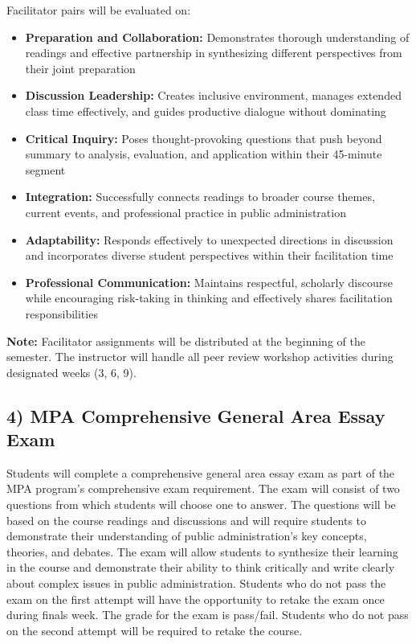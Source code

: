 \documentclass[12pt, letterpaper]{article}
\begin{document}
Facilitator pairs will be evaluated on:
\begin{itemize}
    \item \textbf{Preparation and Collaboration:} Demonstrates thorough understanding of readings and effective partnership in synthesizing different perspectives from their joint preparation
    \item \textbf{Discussion Leadership:} Creates inclusive environment, manages extended class time effectively, and guides productive dialogue without dominating
    \item \textbf{Critical Inquiry:} Poses thought-provoking questions that push beyond summary to analysis, evaluation, and application within their 45-minute segment
    \item \textbf{Integration:} Successfully connects readings to broader course themes, current events, and professional practice in public administration
    \item \textbf{Adaptability:} Responds effectively to unexpected directions in discussion and incorporates diverse student perspectives within their facilitation time
    \item \textbf{Professional Communication:} Maintains respectful, scholarly discourse while encouraging risk-taking in thinking and effectively shares facilitation responsibilities
\end{itemize}

\textbf{Note:} Facilitator assignments will be distributed at the beginning of the semester. The instructor will handle all peer review workshop activities during designated weeks (3, 6, 9).

\subsection*{4) MPA Comprehensive General Area Essay Exam}

Students will complete a comprehensive general area essay exam as part of the MPA program's comprehensive exam requirement. The exam will consist of two questions from which students will choose one to answer. The questions will be based on the course readings and discussions and will require students to demonstrate their understanding of public administration's key concepts, theories, and debates. The exam will allow students to synthesize their learning in the course and demonstrate their ability to think critically and write clearly about complex issues in public administration. Students who do not pass the exam on the first attempt will have the opportunity to retake the exam once during finals week. The grade for the exam is pass/fail. Students who do not pass on the second attempt will be required to retake the course.
\end{document}
